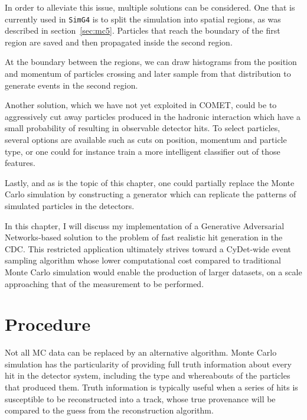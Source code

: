 In order to alleviate this issue, multiple solutions can be considered. One that is currently used in \texttt{SimG4} is to split the simulation into spatial regions, as was described in section~\ref{sec:mc5}. Particles that reach the boundary of the first region are saved and then propagated inside the second region. 


At the boundary between the regions, we can draw histograms from the position and momentum of particles crossing and later sample from that distribution to generate events in the second region.

Another solution, which we have not yet exploited in COMET, could be to aggressively cut away particles produced in the hadronic interaction which have a small probability of resulting in observable detector hits. To select particles, several options are available such as cuts on position, momentum and particle type, or one could for instance train a more intelligent classifier out of those features.

Lastly, and as is the topic of this chapter, one could partially replace the Monte Carlo simulation by constructing %
a generator which can replicate the patterns of simulated particles in the detectors.

In this chapter, I will discuss my implementation of a Generative Adversarial Networks-based solution to the problem of fast realistic hit generation in the CDC. This restricted application ultimately strives toward a CyDet-wide event sampling algorithm whose lower computational cost compared to traditional Monte Carlo simulation would enable the production of larger datasets, on a scale approaching that of the measurement to be performed.

\section{Procedure}
Not all MC data can be replaced by an alternative algorithm. Monte Carlo simulation has the particularity of providing full truth information about every hit in the detector system, including the type and whereabouts of the particles that produced them.
Truth information is typically useful when a series of hits is susceptible to be reconstructed into a track, whose true provenance will be compared to the guess from the reconstruction algorithm. %

